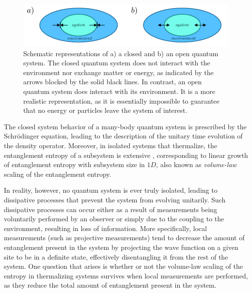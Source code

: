 \begin{figure}[ht]
    \centering
    \includegraphics[width=\textwidth]{Chapters/Plots/Chapter1/Chapter0_Fig4.pdf}
    \caption{Schematic representations of a) a closed and b) an open quantum system. The closed quantum system does not interact with the environment nor exchange matter or energy, as indicated by the arrows blocked by the solid black lines. In contrast, an open quantum system does interact with its environment. It is a more realistic representation, as it is essentially impossible to guarantee that no energy or particles leave the system of interest.}
    \label{fig:Chapter0_Fig4}
\end{figure}

The closed system behavior of a many-body quantum system is prescribed by the Schr\"{o}dinger equation, leading to the description of the unitary time evolution of the density operator. Moreover, in isolated systems that thermalize, the entanglement entropy of a subsystem is extensive \cite{nandkishore2015}, corresponding to linear growth of entanglement entropy with subsystem size in $1D$, also known as \textit{volume-law} scaling of the entanglement entropy. 

In reality, however, no quantum system is ever truly isolated, leading to dissipative processes that prevent the system from evolving unitarily. Such dissipative processes can occur either as a result of measurements being voluntarily performed by an observer or simply due to the coupling to the environment, resulting in loss of information. More specifically, local measurements (such as projective measurements) tend to decrease the amount of entanglement present in the system by projecting the wave function on a given site to be in a definite state, effectively disentangling it from the rest of the system. One question that arises is whether or not the volume-law scaling of the entropy in thermalizing systems survives when local measurements are performed, as they reduce the total amount of entanglement present in the system. 

